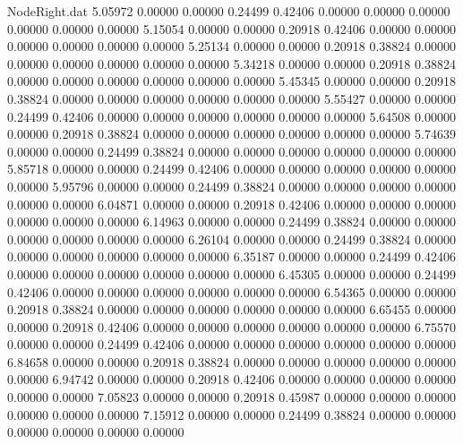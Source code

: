 \begin{filecontents}{NodeRight.dat}
   5.05972    0.00000    0.00000     0.24499    0.42406    0.00000    0.00000    0.00000    0.00000    0.00000    0.00000
   5.15054    0.00000    0.00000     0.20918    0.42406    0.00000    0.00000    0.00000    0.00000    0.00000    0.00000
   5.25134    0.00000    0.00000     0.20918    0.38824    0.00000    0.00000    0.00000    0.00000    0.00000    0.00000
   5.34218    0.00000    0.00000     0.20918    0.38824    0.00000    0.00000    0.00000    0.00000    0.00000    0.00000
   5.45345    0.00000    0.00000     0.20918    0.38824    0.00000    0.00000    0.00000    0.00000    0.00000    0.00000
   5.55427    0.00000    0.00000     0.24499    0.42406    0.00000    0.00000    0.00000    0.00000    0.00000    0.00000
   5.64508    0.00000    0.00000     0.20918    0.38824    0.00000    0.00000    0.00000    0.00000    0.00000    0.00000
   5.74639    0.00000    0.00000     0.24499    0.38824    0.00000    0.00000    0.00000    0.00000    0.00000    0.00000
   5.85718    0.00000    0.00000     0.24499    0.42406    0.00000    0.00000    0.00000    0.00000    0.00000    0.00000
   5.95796    0.00000    0.00000     0.24499    0.38824    0.00000    0.00000    0.00000    0.00000    0.00000    0.00000
   6.04871    0.00000    0.00000     0.20918    0.42406    0.00000    0.00000    0.00000    0.00000    0.00000    0.00000
   6.14963    0.00000    0.00000     0.24499    0.38824    0.00000    0.00000    0.00000    0.00000    0.00000    0.00000
   6.26104    0.00000    0.00000     0.24499    0.38824    0.00000    0.00000    0.00000    0.00000    0.00000    0.00000
   6.35187    0.00000    0.00000     0.24499    0.42406    0.00000    0.00000    0.00000    0.00000    0.00000    0.00000
   6.45305    0.00000    0.00000     0.24499    0.42406    0.00000    0.00000    0.00000    0.00000    0.00000    0.00000
   6.54365    0.00000    0.00000     0.20918    0.38824    0.00000    0.00000    0.00000    0.00000    0.00000    0.00000
   6.65455    0.00000    0.00000     0.20918    0.42406    0.00000    0.00000    0.00000    0.00000    0.00000    0.00000
   6.75570    0.00000    0.00000     0.24499    0.42406    0.00000    0.00000    0.00000    0.00000    0.00000    0.00000
   6.84658    0.00000    0.00000     0.20918    0.38824    0.00000    0.00000    0.00000    0.00000    0.00000    0.00000
   6.94742    0.00000    0.00000     0.20918    0.42406    0.00000    0.00000    0.00000    0.00000    0.00000    0.00000
   7.05823    0.00000    0.00000     0.20918    0.45987    0.00000    0.00000    0.00000    0.00000    0.00000    0.00000
   7.15912    0.00000    0.00000     0.24499    0.38824    0.00000    0.00000    0.00000    0.00000    0.00000    0.00000

\end{filecontents}
